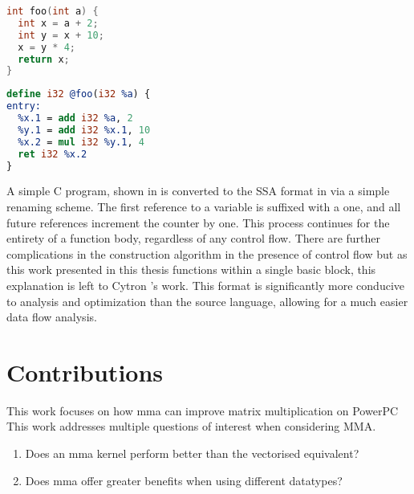 \documentclass[\main/thesis.tex]{subfiles}
\begin{document}
\noindent
\begin{minipage}[t]{0.45\linewidth}
\centering
\begin{lstlisting}[caption={[Example C program, pre-SSA conversion.]An simple example C program, pre-conversion to \gls{ssa}.},
      label=lst:cSSA,numbers=none,language=c]
int foo(int a) {
  int x = a + 2;
  int y = x + 10;
  x = y * 4;
  return x;
}
\end{lstlisting}
\end{minipage}
\hspace{.05\linewidth}
\begin{minipage}[t]{0.45\linewidth}
\centering
\begin{lstlisting}[caption={[Example LLVM IR program, post-SSA conversion.]The same simple program, converted to \gls{llvm} \gls{ir} in \gls{ssa} format.},
      label=lst:llSSA,numbers=none,language=llvm]
define i32 @foo(i32 %a) {
entry:
  %x.1 = add i32 %a, 2
  %y.1 = add i32 %x.1, 10
  %x.2 = mul i32 %y.1, 4
  ret i32 %x.2
}
\end{lstlisting}
\end{minipage}

A simple C program, shown in  is converted to the SSA format in  via a simple renaming scheme.
The first reference to a variable is suffixed with a one, and all future references increment the counter by one.
This process continues for the entirety of a function body, regardless of any control flow.
There are further complications in the construction algorithm in the presence of control flow but as this work presented in this thesis functions within a single \gls{basic block}, this explanation is left to Cytron \etal's work.
This format is significantly more conducive to analysis and optimization than the source language, allowing for a much easier data flow analysis.

\section{Contributions}
This work focuses on how \gls{mma} can improve matrix multiplication on PowerPC
This work addresses multiple questions of interest when considering MMA.
\begin{enumerate}
  \item
    Does an \gls{mma} kernel perform better than the vectorised equivalent?
  \item
    Does \gls{mma} offer greater benefits when using different datatypes?
\end{enumerate}
\end{document}
